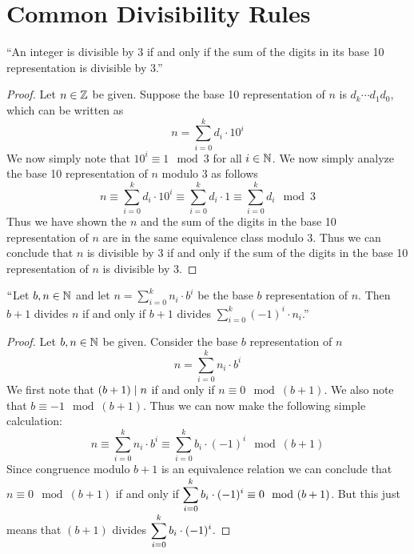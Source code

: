     \section{Common Divisibility Rules}
        \begin{theorem}
            ``An integer is divisible by $3$ if and only if the sum of the digits in its base 10
            representation is divisible by $3$.''
        \end{theorem}
        \begin{proof}
            Let $n \in \mathbb{Z}$ be given. Suppose the base 10 representation of $n$ is
            $d_k \cdots d_1 d_0$, which can be written as
            \[
                n = \sum_{i = 0}^{k} d_i \cdot 10^i
            \]
            We now simply note that $10^i \equiv 1 \mod 3$ for all $i \in \mathbb{N}$. We now simply
            analyze the base 10 representation of $n$ modulo 3 as follows
            \[
                n \equiv \sum_{i = 0}^{k} d_i \cdot 10^i \equiv \sum_{i = 0}^{k} d_i \cdot 1 \equiv \sum_{i = 0}^{k} d_i \mod 3
            \]
            Thus we have shown the $n$ and the sum of the digits in the base 10 representation of
            $n$ are in the same equivalence class modulo 3. Thus we can conclude that $n$
            is divisible by 3 if and only if the sum of the digits in the base 10 representation of $n$
            is divisible by 3. \QED
        \end{proof}
        \begin{theorem}
            $``$Let $b, n \in \mathbb{N}$ and let $n = \sum_{i = 0}^{k} n_i \cdot b^i$ be the base
            $b$ representation of $n$. Then $b + 1$ divides $n$ if and only if $b + 1$ divides
            $\sum_{i = 0}^{k} (-1)^{i} \cdot n_i$.''
        \end{theorem}
        \begin{proof}
            Let $b, n \in \mathbb{N}$ be given. Consider the base $b$ representation of $n$
            \[
                n = \sum_{i = 0}^{k} n_i \cdot b^i
            \]
            We first note that $(b + 1) \mid n$ if and only if $n \equiv 0 \mod (b + 1)$.
            We also note that $b \equiv -1 \mod (b + 1)$. Thus we can now make the following
            simple calculation:
            \[
                n \equiv \sum_{i = 0}^{k} n_i \cdot b^i \equiv  \sum_{i = 0}^{k} b_i \cdot (-1)^i \mod (b + 1)
            \]
            Since congruence modulo $b + 1$ is an equivalence relation we can conclude that
            $n \equiv 0 \mod (b + 1)$ if and only if $\displaystyle\sum_{i = 0}^{k} b_i \cdot (-1)^i \equiv 0 \mod (b + 1)$.
            But this just means that $(b + 1)$ divides ${\displaystyle\sum_{i = 0}^{k} b_i \cdot (-1)^i}$. \QED
        \end{proof}
